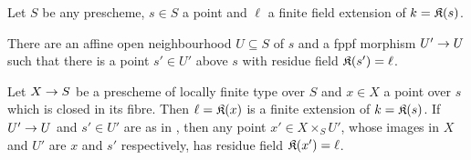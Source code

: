 \documentclass[a4paper,parskip=half,numbers=enddot, DIV=12]{scrreprt}
\begin{document}
\begin{lem}
	Let $S$ be any prescheme, $s\in S$ a point and $\ell$ a finite field extension of $k=\mathfrak{K}(s)$.
	\begin{alphanumerate}
		\item There are an affine open neighbourhood $U\subseteq S$ of  $s$ and a fppf morphism $U'\morphism U$ such that there is a point $s'\in U'$ above $s$ with residue field $\mathfrak{K}(s')=\ell$.
		\item Let $X\morphism S$ be a prescheme of locally finite type over $S$ and $x\in X$ a point over $s$ which is closed in its fibre. Then $\ell=\mathfrak{K}(x)$ is a finite extension of $k=\mathfrak{K}(s)$. If $U'\morphism U$ and $s'\in U'$ are as in , then any point $x'\in X\times_SU'$, whose images in $X$ and $U'$ are $x$ and $s'$ respectively, has residue field $\mathfrak{K}(x')=\ell$.
	\end{alphanumerate}
	\end{lem}
\end{document}
